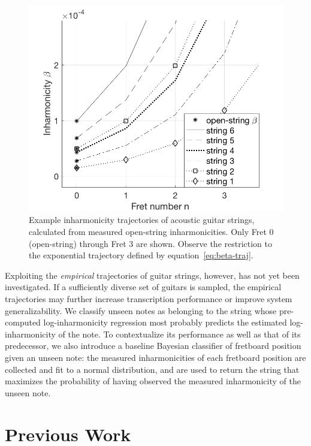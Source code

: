 \documentclass[convention,peer-reviewed]{aesconf}
\begin{document}
\begin{figure}[h] 
\centering
\includegraphics[scale=0.25]{figs/beta-trajectories-ag}
\caption{Example inharmonicity trajectories of acoustic guitar strings, calculated from measured open-string inharmonicities. Only Fret 0 (open-string) through Fret 3 are shown. Observe the restriction to the exponential trajectory defined by equation~\eqref{eq:beta-traj}.}
\label{fig:beta-trajectories-ag}
\end{figure}

Exploiting the \textit{empirical} trajectories of guitar strings, however, has not yet been investigated. If a sufficiently diverse set of guitars is sampled, the empirical trajectories may further increase transcription performance or improve system generalizability. We classify unseen notes as belonging to the string whose pre-computed log-inharmonicity regression most probably predicts the estimated log-inharmonicity of the note. To contextualize its performance as well as that of its predecessor, we also introduce a baseline Bayesian classifier of fretboard position given an unseen note: the measured inharmonicities of each fretboard position are collected and fit to a normal distribution, and are used to return the string that maximizes the probability of having observed the measured inharmonicity of the unseen note.

\section{Previous Work}
\end{document}
